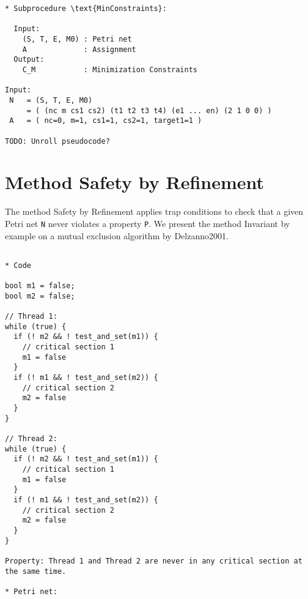 \documentclass{article}
\begin{document}
\begin{verbatim}
* Subprocedure \text{MinConstraints}:

  Input:
    (S, T, E, M0) : Petri net
    A             : Assignment
  Output:
    C_M           : Minimization Constraints

Input:
 N   = (S, T, E, M0)
     = ( (nc m cs1 cs2) (t1 t2 t3 t4) (e1 ... en) (2 1 0 0) )
 A   = ( nc=0, m=1, cs1=1, cs2=1, target1=1 )

TODO: Unroll pseudocode?

\end{verbatim}

\newpage

\section{Method Safety by Refinement}

The method Safety by Refinement applies trap conditions to check that a given Petri net \verb=N= never violates a property \verb=P=.
We present the method Invariant by example on a mutual exclusion algorithm by Delzanno2001.

\begin{verbatim}

* Code

bool m1 = false;
bool m2 = false;

// Thread 1:
while (true) {
  if (! m2 && ! test_and_set(m1)) {
    // critical section 1
    m1 = false
  }
  if (! m1 && ! test_and_set(m2)) {
    // critical section 2
    m2 = false
  }
}

// Thread 2:
while (true) {
  if (! m2 && ! test_and_set(m1)) {
    // critical section 1
    m1 = false
  }
  if (! m1 && ! test_and_set(m2)) {
    // critical section 2
    m2 = false
  }
}

Property: Thread 1 and Thread 2 are never in any critical section at the same time.

* Petri net:
\end{verbatim}
\begin{center}
\end{center}
\end{document}
